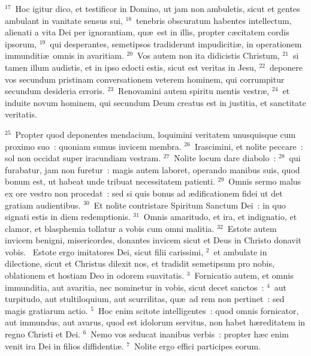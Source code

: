 ${}^{17}$~Hoc igitur dico, et testificor in Domino, ut jam non ambuletis, sicut et gentes ambulant in vanitate sensus sui,
${}^{18}$~tenebris obscuratum habentes intellectum, alienati a vita Dei per ignorantiam, qu\ae\ est in illis, propter c\ae citatem cordis ipsorum,
${}^{19}$~qui desperantes, semetipsos tradiderunt impudiciti\ae , in operationem immunditi\ae\ omnis in avaritiam.
${}^{20}$~Vos autem non ita didicistis Christum,
${}^{21}$~si tamen illum audistis, et in ipso edocti estis, sicut est veritas in Jesu,
${}^{22}$~deponere vos secundum pristinam conversationem veterem hominem, qui corrumpitur secundum desideria erroris.
${}^{23}$~Renovamini autem spiritu mentis vestr\ae ,
${}^{24}$~et induite novum hominem, qui secundum Deum creatus est in justitia, et sanctitate veritatis.


${}^{25}$~Propter quod deponentes mendacium, loquimini veritatem unusquisque cum proximo suo~: quoniam sumus invicem membra.
${}^{26}$~Irascimini, et nolite peccare~: sol non occidat super iracundiam vestram.
${}^{27}$~Nolite locum dare diabolo~:
${}^{28}$~qui furabatur, jam non furetur~: magis autem laboret, operando manibus suis, quod bonum est, ut habeat unde tribuat necessitatem patienti.
${}^{29}$~Omnis sermo malus ex ore vestro non procedat~: sed si quis bonus ad \ae dificationem fidei ut det gratiam audientibus.
${}^{30}$~Et nolite contristare Spiritum Sanctum Dei~: in quo signati estis in diem redemptionis.
${}^{31}$~Omnis amaritudo, et ira, et indignatio, et clamor, et blasphemia tollatur a vobis cum omni malitia.
${}^{32}$~Estote autem invicem benigni, misericordes, donantes invicem sicut et Deus in Christo donavit vobis.
~\lettrine[lines=10,image=true,loversize=0.05,lraise=-0.03]{E}{}stote ergo imitatores Dei, sicut filii carissimi,
${}^{2}$~et ambulate in dilectione, sicut et Christus dilexit nos, et tradidit semetipsum pro nobis, oblationem et hostiam Deo in odorem suavitatis.
${}^{3}$~Fornicatio autem, et omnis immunditia, aut avaritia, nec nominetur in vobis, sicut decet sanctos~:
${}^{4}$~aut turpitudo, aut stultiloquium, aut scurrilitas, qu\ae\ ad rem non pertinet~: sed magis gratiarum actio.
${}^{5}$~Hoc enim scitote intelligentes~: quod omnis fornicator, aut immundus, aut avarus, quod est idolorum servitus, non habet h\ae reditatem in regno Christi et Dei.
${}^{6}$~Nemo vos seducat inanibus verbis~: propter h\ae c enim venit ira Dei in filios diffidenti\ae .
${}^{7}$~Nolite ergo effici participes eorum.


